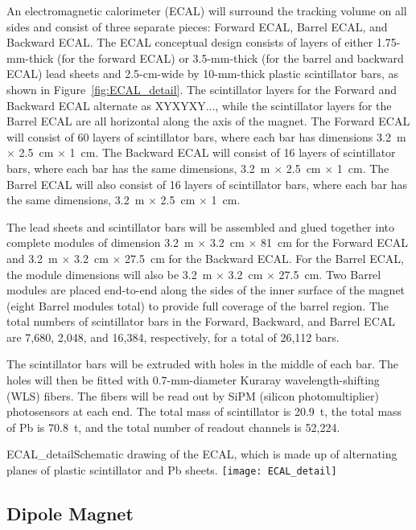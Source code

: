 An electromagnetic calorimeter 
(ECAL) will surround the tracking volume on all sides and consist of three separate pieces: Forward ECAL, Barrel ECAL, and Backward ECAL.  
The ECAL conceptual design consists of 
layers of either 1.75-mm-thick (for the forward ECAL) or 3.5-mm-thick 
(for the barrel and backward ECAL) lead sheets and 2.5-cm-wide by 10-mm-thick 
plastic scintillator bars,
as shown in Figure~\ref{fig:ECAL_detail}. 
The scintillator layers for the
Forward and Backward ECAL alternate as XYXYXY..., while the scintillator 
layers for the Barrel ECAL are all horizontal along the axis of the magnet.
The Forward ECAL will consist of 60 layers of scintillator bars, where each
bar has dimensions 3.2~m $\times$ 2.5~cm $\times$ 1~cm. The
Backward ECAL will consist of 16 layers of scintillator bars, where each 
bar has the same dimensions, 3.2~m $\times$ 2.5~cm $\times$ 1~cm. The Barrel ECAL will also consist 
of 16 layers of scintillator bars, where each bar has the same dimensions, 
3.2~m $\times$ 2.5~cm $\times$ 1~cm. 

The lead sheets and scintillator bars will be assembled and glued together
into complete modules of dimension 
3.2~m $\times$ 3.2~cm $\times$ 81~cm for the Forward ECAL and
3.2~m $\times$ 3.2~cm $\times$ 27.5~cm for the Backward ECAL. For the Barrel ECAL, the module 
dimensions will also be 
3.2~m $\times$ 3.2~cm $\times$ 27.5~cm. Two Barrel modules are placed end-to-end 
along the sides of the inner surface of the magnet (eight Barrel modules
total) to provide full coverage of the barrel region.
The total numbers of scintillator bars in the
Forward, Backward, and Barrel ECAL are 7,680, 2,048, and 16,384, respectively, 
for a total of 26,112 bars. 

The scintillator bars will be extruded with 
holes in the middle of each bar. The
holes will then be fitted with 0.7-mm-diameter Kuraray wavelength-shifting (WLS) fibers.
The fibers will be read out by SiPM (silicon photomultiplier) photosensors at each end.
The total mass of scintillator is 20.9~t, 
the total mass of Pb is 70.8~t, and
the total number of readout channels is 52,224. 

\begin{cdrfigure}{ECAL_detail}{Schematic drawing of the ECAL, which is made up of alternating planes
of plastic scintillator and Pb sheets.}
\texttt{[image: ECAL\_detail]}
\end{cdrfigure}


\subsection{Dipole Magnet}
\label{cdrsec:detectors-nd-ref-fgt-magnet}

